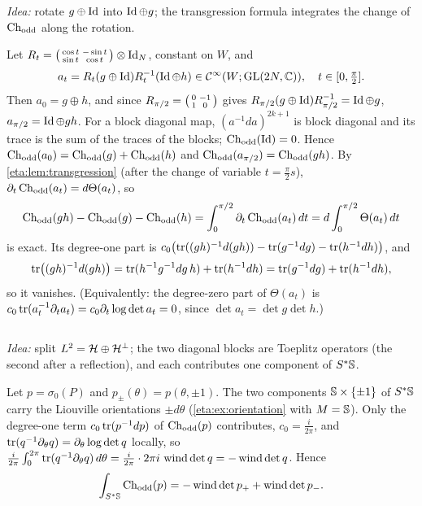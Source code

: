 \emph{Idea:} rotate $g\oplus\operatorname{Id}$ into $\operatorname{Id}\oplus g$; the transgression formula
integrates the change of $\operatorname{Ch}_{\mathrm{odd}}$ along the rotation.

Let $R_t=\begin{psmallmatrix}\cos t&-\sin t\\ \sin t&\cos t\end{psmallmatrix}\otimes
\operatorname{Id}_N$, constant on $W$, and
\begin{equation*}
  a_t=R_t(g\oplus\operatorname{Id})R_t^{-1}(\operatorname{Id}\oplus h)\in\mathcal{C}^\infty(W;\operatorname{GL}(2N,\mathbb{C})),\quad t\in[0,\tfrac\pi2].
\end{equation*}
Then $a_0=g\oplus h$, and since $R_{\pi/2}=\begin{psmallmatrix}0&-1\\1&0\end{psmallmatrix}$
gives $R_{\pi/2}(g\oplus\operatorname{Id})R_{\pi/2}^{-1}=\operatorname{Id}\oplus g$, $a_{\pi/2}=\operatorname{Id}\oplus gh$. For a
block diagonal map, $(a^{-1}da)^{2k+1}$ is block diagonal and its trace is the sum
of the traces of the blocks; $\operatorname{Ch}_{\mathrm{odd}}(\operatorname{Id})=0$. Hence
$\operatorname{Ch}_{\mathrm{odd}}(a_0)=\operatorname{Ch}_{\mathrm{odd}}(g)+\operatorname{Ch}_{\mathrm{odd}}(h)$ and $\operatorname{Ch}_{\mathrm{odd}}(a_{\pi/2})=\operatorname{Ch}_{\mathrm{odd}}(gh)$. By
\cref{eta:lem:transgression} (after the change of variable $t=\frac\pi2s$),
$\partial_t\operatorname{Ch}_{\mathrm{odd}}(a_t)=d\Theta(a_t)$, so
\begin{equation*}
  \operatorname{Ch}_{\mathrm{odd}}(gh)-\operatorname{Ch}_{\mathrm{odd}}(g)-\operatorname{Ch}_{\mathrm{odd}}(h)=\int_0^{\pi/2}\partial_t\operatorname{Ch}_{\mathrm{odd}}(a_t)\,dt
  =d\int_0^{\pi/2}\Theta(a_t)\,dt
\end{equation*}
is exact. Its degree-one part is
$c_0\bigl(\operatorname{tr}((gh)^{-1}d(gh))-\operatorname{tr}(g^{-1}dg)-\operatorname{tr}(h^{-1}dh)\bigr)$, and
\begin{equation*}
  \operatorname{tr}\bigl((gh)^{-1}d(gh)\bigr)=\operatorname{tr}(h^{-1}g^{-1}dg\,h)+\operatorname{tr}(h^{-1}dh)
  =\operatorname{tr}(g^{-1}dg)+\operatorname{tr}(h^{-1}dh),
\end{equation*}
so it vanishes. (Equivalently: the degree-zero part of $\Theta(a_t)$ is
$c_0\operatorname{tr}(a_t^{-1}\partial_ta_t)=c_0\partial_t\log\det a_t=0$, since $\det a_t=\det g\det h$.)

\subsection*{}

\emph{Idea:} split $L^2=\mathcal{H}\oplus\mathcal{H}^\perp$; the two diagonal blocks are
Toeplitz operators (the second after a reflection), and each contributes one
component of $S^*\mathbb{S}$.

Let $p=\sigma_0(P)$ and $p_\pm(\theta)=p(\theta,\pm1)$. The two components
$\mathbb{S}\times\{\pm1\}$ of $S^*\mathbb{S}$ carry the Liouville orientations $\pm d\theta$
(\cref{eta:ex:orientation} with $M=\mathbb{S}$). Only the degree-one term
$c_0\operatorname{tr}(p^{-1}dp)$ of $\operatorname{Ch}_{\mathrm{odd}}(p)$ contributes, $c_0=\frac i{2\pi}$, and
$\operatorname{tr}(q^{-1}\partial_\theta q)=\partial_\theta\log\det q$ locally, so
$\frac i{2\pi}\int_0^{2\pi}\operatorname{tr}(q^{-1}\partial_\theta q)\,d\theta=\frac i{2\pi}\cdot2\pi i\,
\operatorname{wind}\det q=-\operatorname{wind}\det q$. Hence
\begin{equation*}
  \int_{S^*\mathbb{S}}\operatorname{Ch}_{\mathrm{odd}}(p)=-\operatorname{wind}\det p_++\operatorname{wind}\det p_- .
\end{equation*}


